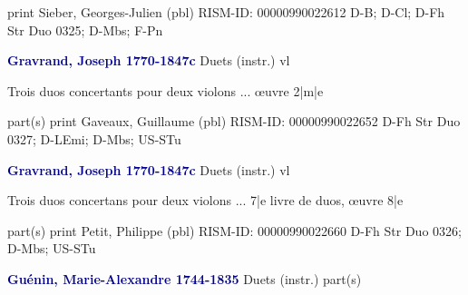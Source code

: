 \documentclass[twocolumn]{book}
\begin{document}
\newline print
\newline Sieber, Georges-Julien  (pbl)
\newline RISM-ID: 00000990022612
\newline D-B; D-Cl; D-Fh  Str Duo 0325; D-Mbs; F-Pn
\newline \par \vspace{7pt} \textcolor{darkblue}{\textbf{Gravrand, Joseph  1770-1847c}}
\newline Duets (instr.)
 vl
\newline \begin{itshape}Trois duos concertants pour deux violons ... œuvre 2|m|e\end{itshape} 
\newline \textcolor{darkblue}{}  part(s)
\newline print
\newline Gaveaux, Guillaume  (pbl)
\newline RISM-ID: 00000990022652
\newline D-Fh  Str Duo 0327; D-LEmi; D-Mbs; US-STu
\newline \par \vspace{7pt} \textcolor{darkblue}{\textbf{Gravrand, Joseph  1770-1847c}}
\newline Duets (instr.)
 vl
\newline \begin{itshape}Trois duos concertans pour deux violons ... 7|e livre de duos, œuvre 8|e\end{itshape} 
\newline \textcolor{darkblue}{}  part(s)
\newline print
\newline Petit, Philippe  (pbl)
\newline RISM-ID: 00000990022660
\newline D-Fh  Str Duo 0326; D-Mbs; US-STu
\newline \par \vspace{7pt} \textcolor{darkblue}{\textbf{Guénin, Marie-Alexandre  1744-1835}}
\newline Duets (instr.)
\newline \textcolor{darkblue}{}  part(s)
\end{document}
